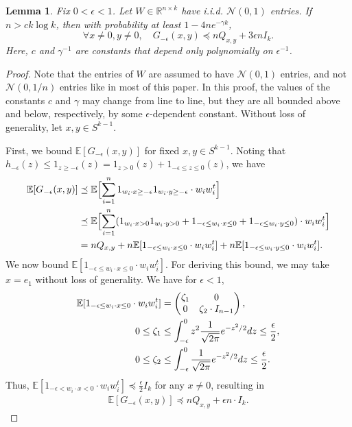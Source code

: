 \documentclass[11pt]{article}
\newtheorem{lemma}[theorem]{Lemma}
\newcommand{\R}{\mathbb{R}}
\newcommand{\eps}{\epsilon}
\newcommand{\spherek}{S^{k-1}}
\newcommand{\calN}{\mathcal{N}}
\newcommand{\tran}{t}
\newcommand{\wi}{w_i}
\newcommand{\wix}{w_i \cdot x}
\newcommand{\wiy}{w_i \cdot y}
\newcommand{\wit}{w_i^\tran}
\newcommand{\hmeps}{h_{-\eps}}
\newcommand{\Gmeps}{G_{-\eps}}
\newcommand{\matrixleq}{\preceq}
\newcommand{\E}{\mathbb{E}}
\newcommand{\Qxy}{Q_{x,y}}
\begin{document}
\begin{lemma} \label{lemma:Gmeps-uniform} 
Fix $0 < \eps < 1$.  Let $W \in \R^{n \times k}$ have i.i.d. $\calN(0,1)$ entries.   If $n > c k \log k$, then with probability at least $1- 4 n e^{-\gamma k}$,
\[
\forall x\neq 0,y\neq 0, \quad \Gmeps(x,y) \matrixleq  n \Qxy  + 3 \eps n I_k.
\]
Here, $c$ and $\gamma^{-1}$ are constants that depend only polynomially on $\eps^{-1}$.
\end{lemma} 
\begin{proof}
Note that the entries of $W$ are assumed to have $\mathcal{N}(0,1)$ entries, and not $\mathcal{N}(0, 1/n)$ entries like in most of this paper.
In this proof, the values of the constants $c$ and $\gamma$ may change from line to line, but they are all bounded above and below, respectively, by some $\eps$-dependent constant.  Without loss of generality, let $x,y \in \spherek$. 

First, we bound $\E[\Gmeps(x,y)]$ for fixed $x, y \in \spherek$.   Noting that $\hmeps(z)  \leq 1_{z\geq -\eps}(z) = 1_{z>0}(z) + 1_{-\eps \leq z \leq 0}(z)$, we have
\begin{align}
\E[ \Gmeps(x,y) ] &\matrixleq \E \Bigl[ \sum_{i=1}^n 1_{\wix \geq -\eps} 1_{\wiy \geq -\eps} \cdot \wi \wit  \Bigr] \notag \\
&\matrixleq \E \Bigl[\sum_{i=1}^n (1_{\wix>0} 1_{\wiy>0} + 1_{-\eps \leq \wix \leq 0} + 1_{-\eps \leq \wiy \leq 0} ) \cdot  \wi \wit \Bigr] \notag \\
&=  n\Qxy +  n \E[ 1_{-\eps\leq \wix \leq 0} \cdot \wi \wit ] +  n \E[ 1_{-\eps\leq \wiy \leq 0} \cdot \wi \wit ]. \notag
\end{align}
We now bound $\E[ 1_{-\eps\leq \wix \leq 0} \cdot \wi \wit ]$.  For deriving this bound, we may take $x = e_1$ without loss of generality.  We have for $\eps < 1$, 
\begin{align}
\E[ 1_{-\eps\leq \wix \leq 0} \cdot \wi \wit  ] &= \begin{pmatrix}\zeta_1 & 0 \\ 0 & \zeta_2 \cdot I_{n-1} \end{pmatrix}, \notag \\
0 \leq \zeta_1 &\leq \int_{-\eps}^0 z^2 \frac{1}{\sqrt{2 \pi}} e^{-z^2/2} dz \leq \frac{\eps}{2}, \notag \\
0 \leq \zeta_2 &\leq \int_{-\eps}^0  \frac{1}{\sqrt{2 \pi}} e^{-z^2/2} dz \leq \frac{\eps}{2}. \notag
\end{align}
Thus, $\E[ 1_{-\eps< \wix < 0} \cdot \wi \wit ] \matrixleq \frac{\eps}{2} I_k$ for any $x \neq 0$, resulting in
\begin{align}
\E[\Gmeps(x, y)] \matrixleq n\Qxy + \eps n \cdot I_k. \label{bound-Gmeps-expectation-uniform}
\end{align}


\end{proof}
\end{document}
